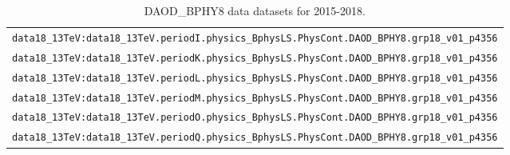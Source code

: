 \begin{table}[!hbp]
\begin{tabular}{|l|}
\verb|data18_13TeV:data18_13TeV.periodI.physics_BphysLS.PhysCont.DAOD_BPHY8.grp18_v01_p4356| \\
\verb|data18_13TeV:data18_13TeV.periodK.physics_BphysLS.PhysCont.DAOD_BPHY8.grp18_v01_p4356| \\
\verb|data18_13TeV:data18_13TeV.periodL.physics_BphysLS.PhysCont.DAOD_BPHY8.grp18_v01_p4356| \\
\verb|data18_13TeV:data18_13TeV.periodM.physics_BphysLS.PhysCont.DAOD_BPHY8.grp18_v01_p4356| \\
\verb|data18_13TeV:data18_13TeV.periodO.physics_BphysLS.PhysCont.DAOD_BPHY8.grp18_v01_p4356| \\
\verb|data18_13TeV:data18_13TeV.periodQ.physics_BphysLS.PhysCont.DAOD_BPHY8.grp18_v01_p4356| \\
\hline
\end{tabular}
\caption{DAOD\_BPHY8 data datasets for 2015-2018.}
\label{tab:DAOD_BPHY8_Data}
\end{table}
